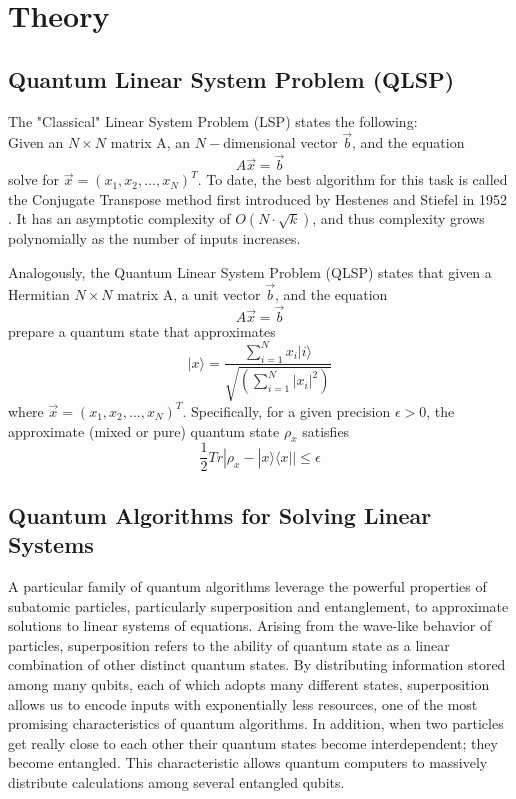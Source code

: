 \chapter{Theory}

\section{Quantum Linear System Problem (QLSP)}

The "Classical" Linear System Problem (LSP) states the following:
\\
Given an $N \times N$ matrix A, an $N-$dimensional vector $\Vec{b}$, and the equation
    \begin{equation*}
        A \Vec{x} = \Vec{b}
    \end{equation*}
solve for $\Vec{x} = (x_1, x_2,...,x_N)^T$. To date, the best algorithm for this task is called the Conjugate Transpose method first introduced by Hestenes and Stiefel in 1952 \cite{hestenes_methods_1952}. It has an asymptotic complexity of $O(N\cdot \sqrt{k})$, and thus complexity grows polynomially as the number of inputs increases. 

Analogously, the Quantum Linear System Problem (QLSP) states that given a Hermitian $N \times N$ matrix A, a unit vector $\Vec{b}$, and the equation
    \begin{equation*}
        A \Vec{x} = \Vec{b}
    \end{equation*}
prepare a quantum state that approximates
\begin{equation*}
    | x \rangle = \frac{\sum_{i=1}^N x_i | i \rangle}{\sqrt{(\sum_{i=1}^N | x_i |^2)}}
\end{equation*}
where $\Vec{x} = (x_1, x_2,...,x_N)^T$. Specifically, for a given precision $\epsilon > 0$, the approximate (mixed or pure) quantum state $\rho_x$ satisfies
\begin{equation*}
    \frac{1}{2}Tr|\rho_x - |x\rangle \langle x| | \leq \epsilon
\end{equation*}

\section{Quantum Algorithms for Solving Linear Systems}

A particular family of quantum algorithms leverage the powerful properties of subatomic particles, particularly superposition and entanglement, to approximate solutions to linear systems of equations. Arising from the wave-like behavior of particles, superposition refers to the ability of quantum state as a linear combination of other distinct quantum states. By distributing information stored among many qubits, each of which adopts many different states, superposition allows us to encode inputs with exponentially less resources, one of the most promising characteristics of quantum algorithms. In addition, when two particles get really close to each other their quantum states become interdependent; they become entangled. This characteristic allows quantum computers to massively distribute calculations among several entangled qubits. 

